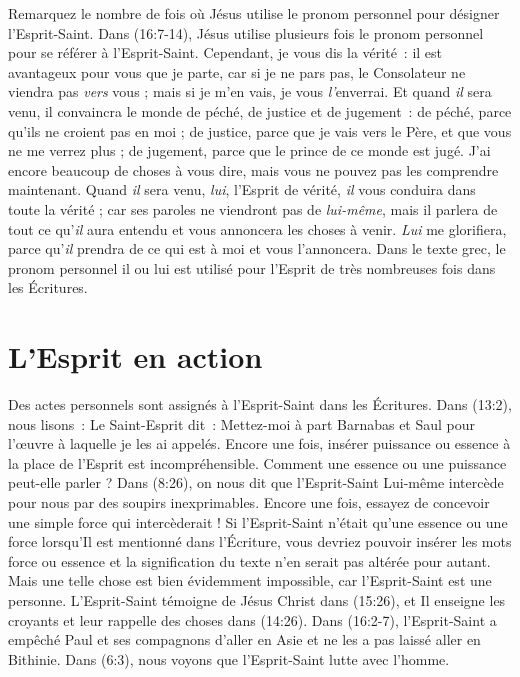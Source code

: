Remarquez le nombre de fois où Jésus utilise le pronom personnel pour
 désigner l'Esprit-Saint. Dans (16:7-14), Jésus utilise
 plusieurs fois le pronom personnel pour se référer à l'Esprit-Saint.
 \og Cependant, je vous dis la vérité~: il est avantageux pour vous
 que je parte, car si je ne pars pas, le Consolateur ne viendra pas
 \emph{vers} vous ; mais si je m'en vais, je vous \emph{l'}enverrai.
 Et quand \emph{il} sera venu, il convaincra le monde de péché,
 de justice et de jugement~: de péché, parce qu'ils ne croient pas en moi ;
 de justice, parce que je vais vers le Père, et que vous ne me verrez plus ;
 de jugement, parce que le prince de ce monde est jugé.
 J'ai encore beaucoup de choses à vous dire, mais vous ne pouvez pas
 les comprendre maintenant. Quand \emph{il} sera venu, \emph{lui},
 l'Esprit de vérité, \emph{il} vous conduira dans toute la vérité ;
 car ses paroles ne viendront pas de \emph{lui-même}, mais il parlera de
 tout ce qu'\emph{il} aura entendu et vous annoncera les choses à venir.
 \emph{Lui} me glorifiera, parce qu'\emph{il} prendra de ce qui est à moi
 et vous l'annoncera. \fg{}
 Dans le texte grec, le pronom personnel \og il \fg{} ou \og lui \fg{}
 est utilisé pour l'Esprit de très nombreuses fois dans les Écritures.

\section*{L'Esprit en action}

Des actes personnels sont assignés à l'Esprit-Saint dans les Écritures. Dans
 (13:2), nous lisons~: \og Le Saint-Esprit dit~:
 Mettez-moi à part Barnabas et Saul pour l'œuvre à laquelle je les ai
 appelés. \fg{}
 Encore une fois, insérer \og puissance \fg{} ou \og essence \fg{} à la place
 de l'Esprit est incompréhensible. Comment une essence ou une puissance
 peut-elle parler ? Dans (8:26), on nous dit que l'Esprit-Saint
 Lui-même intercède pour nous par des soupirs inexprimables.
 Encore une fois, essayez de concevoir une simple force qui intercèderait !
 Si l'Esprit-Saint n'était qu'une essence ou une force lorsqu'Il est mentionné
 dans l'Écriture, vous devriez pouvoir insérer les mots \og force \fg{} ou
 \og essence \fg{} et la signification du texte n'en serait pas altérée pour
 autant. Mais une telle chose est bien évidemment impossible, car
 l'Esprit-Saint est une personne. L'Esprit-Saint témoigne de Jésus Christ dans
 (15:26), et Il enseigne les croyants et leur rappelle des choses
 dans (14:26). Dans (16:2-7), l'Esprit-Saint a
 empêché Paul et ses compagnons d'aller en Asie et ne les a pas laissé aller
 en Bithinie. Dans (6:3), nous voyons que l'Esprit-Saint lutte
 avec l'homme.

